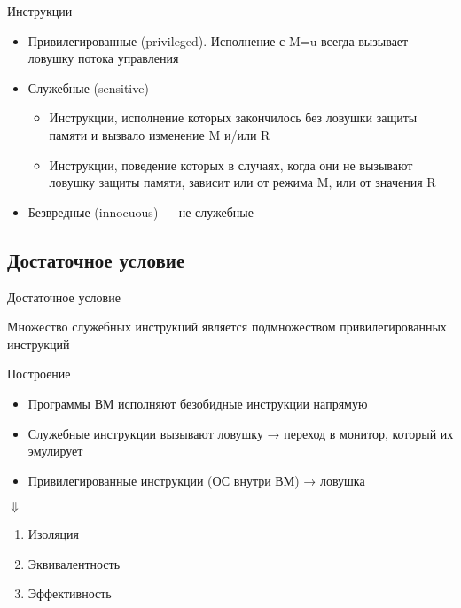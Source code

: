 \begin{frame}{Инструкции}
\begin{itemize}
    \item Привилегированные (privileged). Исполнение с M=u всегда вызывает ловушку потока управления
    \item Служебные (sensitive)
    \begin{itemize}
        \item Инструкции, исполнение которых закончилось без ловушки защиты памяти и вызвало изменение M и/или R
        \item Инструкции, поведение которых в случаях, когда они не вызывают ловушку защиты памяти, зависит или от режима M, или от значения R
    \end{itemize}
    \item Безвредные (innocuous) — не служебные
\end{itemize}
\end{frame}

\subsection{Достаточное условие}

\begin{frame}{Достаточное условие}

Множество служебных инструкций является подмножеством привилегированных инструкций

\centering
{} 
\end{frame}

\begin{frame}{Построение}
\begin{itemize}
    \item Программы ВМ исполняют безобидные инструкции напрямую
    \item Служебные инструкции вызывают ловушку → переход в монитор, который их эмулирует
    \item Привилегированные инструкции (ОС внутри ВМ) → ловушка
\end{itemize}

\centering$\Downarrow$

\begin{enumerate}
    \item Изоляция
    \item Эквивалентность
    \item Эффективность
\end{enumerate}
\end{frame}

